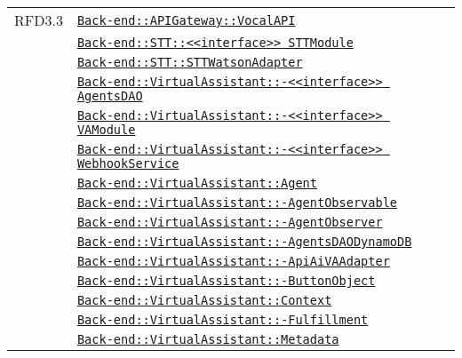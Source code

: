 \begin{longtable}{|>{\centering}m{3cm}|m{10cm}<{\centering}|}
RFD3.3 & \hyperref[Back-end::APIGateway::VocalAPI]{\texttt{Back-end::APIGateway::VocalAPI}}\\
& \hyperref[Back-end::STT::<<interface>> STTModule]{\texttt{Back-end::STT::<<interface>> STTModule}}\\
& \hyperref[Back-end::STT::STTWatsonAdapter]{\texttt{Back-end::STT::STTWatsonAdapter}}\\
& \hyperref[Back-end::VirtualAssistant::<<interface>> AgentsDAO]{\texttt{Back-end::VirtualAssistant::-\linebreak <<interface>> AgentsDAO}}\\
& \hyperref[Back-end::VirtualAssistant::<<interface>> VAModule]{\texttt{Back-end::VirtualAssistant::-\linebreak <<interface>> VAModule}}\\
& \hyperref[Back-end::VirtualAssistant::<<interface>> WebhookService]{\texttt{Back-end::VirtualAssistant::-\linebreak <<interface>> WebhookService}}\\
& \hyperref[Back-end::VirtualAssistant::Agent]{\texttt{Back-end::VirtualAssistant::Agent}}\\
& \hyperref[Back-end::VirtualAssistant::AgentObservable]{\texttt{Back-end::VirtualAssistant::-\linebreak AgentObservable}}\\
& \hyperref[Back-end::VirtualAssistant::AgentObserver]{\texttt{Back-end::VirtualAssistant::-\linebreak AgentObserver}}\\
& \hyperref[Back-end::VirtualAssistant::AgentsDAODynamoDB]{\texttt{Back-end::VirtualAssistant::-\linebreak AgentsDAODynamoDB}}\\
& \hyperref[Back-end::VirtualAssistant::ApiAiVAAdapter]{\texttt{Back-end::VirtualAssistant::-\linebreak ApiAiVAAdapter}}\\
& \hyperref[Back-end::VirtualAssistant::ButtonObject]{\texttt{Back-end::VirtualAssistant::-\linebreak ButtonObject}}\\
& \hyperref[Back-end::VirtualAssistant::Context]{\texttt{Back-end::VirtualAssistant::Context}}\\
& \hyperref[Back-end::VirtualAssistant::Fulfillment]{\texttt{Back-end::VirtualAssistant::-\linebreak Fulfillment}}\\
& \hyperref[Back-end::VirtualAssistant::Metadata]{\texttt{Back-end::VirtualAssistant::Metadata}}\\

\end{longtable}
